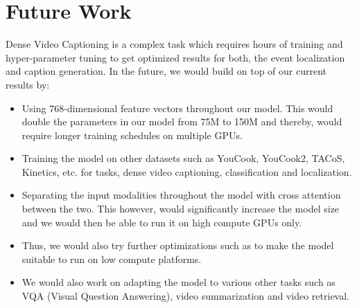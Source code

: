 \section{Future Work}
\par Dense Video Captioning is a complex task which requires hours of training and hyper-parameter tuning to get optimized results for both, the event localization and caption generation. In the future, we would build on top of our current results by: 
\begin{itemize}
	\item Using 768-dimensional feature vectors throughout our model. This would double the parameters in our model from 75M to 150M and thereby, would require longer training schedules on multiple GPUs.
	\item Training the model on other datasets such as YouCook, YouCook2, TACoS, Kinetics, etc. for tasks, dense video captioning, classification and localization.
	\item Separating the input modalities throughout the model with cross attention between the two. This however, would significantly increase the model size and we would then be able to run it on high compute GPUs only. 
	\item Thus, we would also try further optimizations such as to make the model suitable to run on low compute platforms.
	\item We would also work on adapting the model to various other tasks such as VQA (Visual Question Answering), video summarization and video retrieval.
\end{itemize} 


